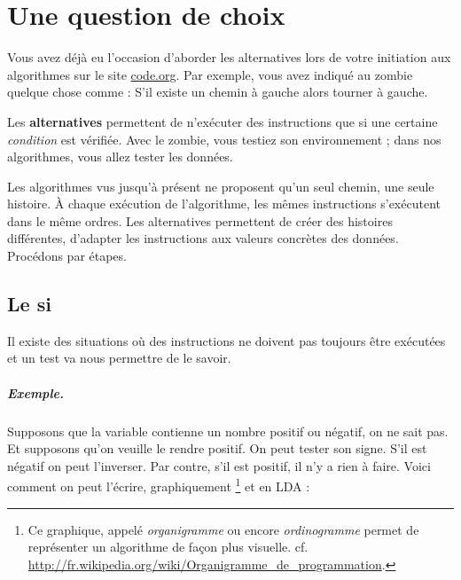 \chapter{Une question de choix}

	Vous avez déjà eu l'occasion d'aborder les alternatives
	lors de votre initiation aux algorithmes sur le site
	\url{code.org}.
	Par exemple, vous avez indiqué au zombie quelque chose comme :
	\og{}S'il existe un chemin à gauche alors tourner à gauche\fg{}.
	
	Les \textbf{alternatives} 
	permettent de n'exécuter des instructions
	que si une certaine \emph{condition} est vérifiée.
	Avec le zombie, vous testiez son environnement ;
	dans nos algorithmes, vous allez tester les données.
	
	Les algorithmes vus jusqu'à présent ne proposent
	qu'un seul \og{}chemin\fg{}, une seule \og{}histoire\fg{}.
	À chaque exécution de l'algorithme,
	les mêmes instructions s'exécutent dans le même ordres.
	Les alternatives permettent de créer des histoires différentes,
	d'adapter les instructions aux valeurs concrètes des données.
	Procédons par étapes.

\section{Le si}
		
	Il existe des situations où
	des instructions ne doivent pas toujours être exécutées
	et un test va nous permettre de le savoir.
	
	\paragraph{Exemple.}
	Supposons que la variable 
	contienne un nombre positif ou négatif,
	on ne sait pas.
	Et supposons qu'on veuille le rendre positif.
	On peut tester son signe.
	S'il est négatif on peut l'inverser.
	Par contre, s'il est positif,
	il n'y a rien à faire.
	Voici comment on peut l'écrire,
	graphiquement%
	\footnote{%
		Ce graphique, appelé 
		\emph{organigramme} ou encore \emph{ordinogramme}
		permet de représenter un algorithme
		de façon plus visuelle.
		cf. \url{http://fr.wikipedia.org/wiki/Organigramme_de_programmation}.
	} et en LDA :
	
